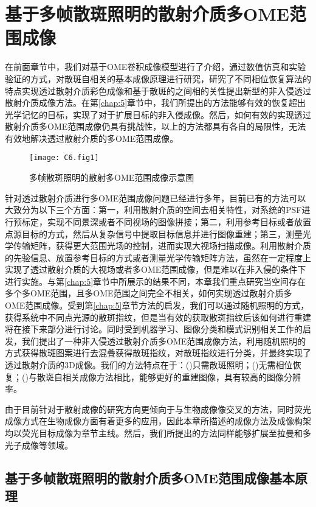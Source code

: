 
\chapter{基于多帧散斑照明的散射介质多OME范围成像}

在前面章节中，我们对基于OME卷积成像模型进行了介绍，通过数值仿真和实验验证的方式，对散斑自相关的基本成像原理进行研究，研究了不同相位恢复算法的特点实现透过散射介质彩色成像和基于散斑的之间相的关性提出新型的非入侵透过散射介质成像方法。在第\ref{chap:5}章节中，我们所提出的方法能够有效的恢复超出光学记忆的目标，实现了对于扩展目标的非入侵成像。然后，如何有效的实现透过散射介质多OME范围成像仍具有挑战性，以上的方法都具有各自的局限性，无法有效地解决透过散射介质的多OME范围成像。

\begin{figure}[htp]
	\centering
	\texttt{[image: C6.fig1]}
	\caption{多帧散斑照明的散射多OME范围成像示意图}
	\label{fig:6.1}
\end{figure}

针对透过散射介质进行多OME范围成像问题已经进行多年，目前已有的方法可以大致分为以下三个方面：第一，利用散射介质的空间去相关特性，对系统的PSF进行预标定，实现不同景深或者不同视场的图像拼接；第二，利用参考目标或者放置点源目标的方式，然后从复杂信号中提取目标信息并进行图像重建；第三，测量光学传输矩阵，获得更大范围光场的控制，进而实现大视场扫描成像。利用散射介质的先验信息、放置参考目标的方式或者测量光学传输矩阵方法，虽然在一定程度上实现了透过散射介质的大视场或者多OME范围成像，但是难以在非入侵的条件下进行实施。与第\ref{chap:5}章节中所展示的结果不同，本章我们重点研究当空间存在多个多OME范围，且多OME范围之间完全不相关，如何实现透过散射介质多OME范围成像。受到第\ref{chap:5}章节方法的启发，我们可以通过随机照明的方式，获得系统中不同点光源的散斑指纹，但是当有效的获取散斑指纹后该如何进行重建将在接下来部分进行讨论。同时受到机器学习、图像分类和模式识别相关工作的启发，我们提出了一种非入侵透过散射介质多OME范围成像方法，利用随机照明的方式获得散斑图案进行去混叠获得散斑指纹，对散斑指纹进行分类，并最终实现了透过散射介质的3D成像。我们的方法特点在于：()只需散斑照明；()无需相位恢复；()与散斑自相关成像方法相比，能够更好的重建图像，具有较高的图像分辨率。

由于目前针对于散射成像的研究方向更倾向于与生物成像像交叉的方法，同时荧光成像方式在生物成像方面有着更多的应用，因此本章所描述的成像方法及成像构架均以荧光目标成像为章节主线。然后，我们所提出的方法同样能够扩展至拉曼和多光子成像等领域。

\section{基于多帧散斑照明的散射介质多OME范围成像基本原理}

